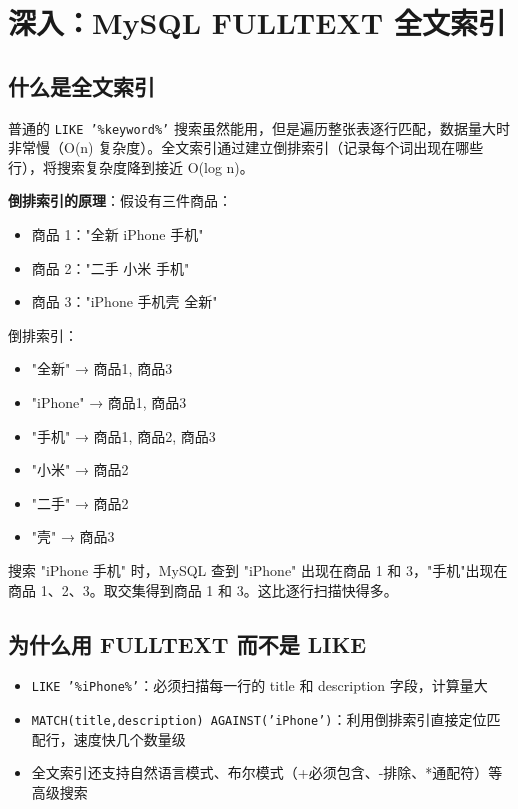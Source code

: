 \documentclass[12pt,a4paper]{ctexart}
\begin{document}
\section{深入：MySQL FULLTEXT 全文索引}

\subsection{什么是全文索引}

普通的 \texttt{LIKE '\%keyword\%'} 搜索虽然能用，但是遍历整张表逐行匹配，数据量大时非常慢（O(n) 复杂度）。全文索引通过建立倒排索引（记录每个词出现在哪些行），将搜索复杂度降到接近 O(log n)。

\textbf{倒排索引的原理}：假设有三件商品：
\begin{itemize}
  \item 商品 1："全新 iPhone 手机"
  \item 商品 2："二手 小米 手机"
  \item 商品 3："iPhone 手机壳 全新"
\end{itemize}

倒排索引：
\begin{itemize}
  \item "全新" → 商品1, 商品3
  \item "iPhone" → 商品1, 商品3
  \item "手机" → 商品1, 商品2, 商品3
  \item "小米" → 商品2
  \item "二手" → 商品2
  \item "壳" → 商品3
\end{itemize}

搜索 "iPhone 手机" 时，MySQL 查到 "iPhone" 出现在商品 1 和 3，"手机"出现在商品 1、2、3。取交集得到商品 1 和 3。这比逐行扫描快得多。

\subsection{为什么用 FULLTEXT 而不是 LIKE}

\begin{itemize}
  \item \texttt{LIKE '\%iPhone\%'}：必须扫描每一行的 title 和 description 字段，计算量大
  \item \texttt{MATCH(title,description) AGAINST('iPhone')}：利用倒排索引直接定位匹配行，速度快几个数量级
  \item 全文索引还支持自然语言模式、布尔模式（+必须包含、-排除、*通配符）等高级搜索
\end{itemize}
\end{document}
